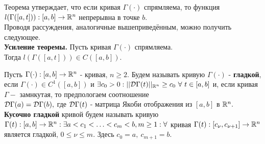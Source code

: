 \documentclass[main]{subfiles}
\begin{document}
Теорема утверждает, что если кривая $\Gamma(\cdot)$ спрямляема, то функция $l(\Gamma([a,t])):[a,b]\rightarrow \mathbb{R}^n$ непрерывна в точке $b.$ \\
 Проводя рассуждения, аналогичные вышеприведённым, можно получить следующее.\\
\textbf{Усиление теоремы.} Пусть кривая $\Gamma(\cdot)$ спрямляема.\\
Тогда $l(\Gamma([a,t]))\in C([a,b]).$\\

\begin{definition}
     Пусть $\Gamma(\cdot):[a,b]\rightarrow{\mathbb{R}^n}$ - кривая, $n\geq 2.$
     Будем называть кривую $\Gamma(\cdot)$ - \textbf{гладкой},
      если $\Gamma(\cdot)\in C^1([a,b])$ и $\exists c_0>0: ||\mathcal{D}\Gamma(t)||_{\mathbb{R}^n}\geq c_0\ \forall\ t\in[a,b]$ и, если кривая $\Gamma - $ замнкутая,
       то предпологаем соотношение\\ $\mathcal{D}\Gamma(a)=\mathcal{D}\Gamma(b),$ где $\mathcal{D}\Gamma(t)$ -
        матрица Якоби отображения из $[a,b]$ в ${\mathbb{R}^n}.$
\textbf{Кусочно гладкой} кривой будем называть кривую $\Gamma(t): [a,b]\to {\mathbb{R}^n}: \exists a<c_1< \ldots<c_m<b, m\geq 1: 
\forall$ кривая $\Gamma(t):[c_\nu,c_{\nu+1}]\to{\mathbb{R}^n}$ является гладкой, $0\leq \nu\leq m.$ Здесь $c_0=a,\ c_{m+1}=b.$
\end{definition}
\end{document}
